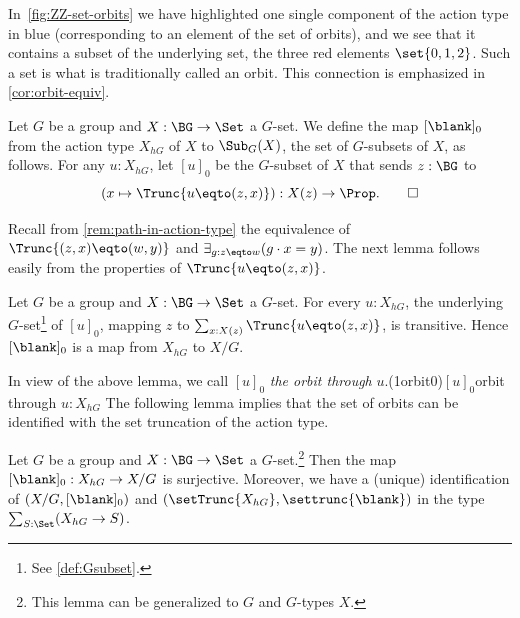 In~\cref{fig:ZZ-set-orbits} we have highlighted one single component of
the action type in blue (\ie corresponding to an element of the set of orbits),
and we see that it contains a subset of the underlying set,
the three red elements $\set{0,1,2}$.
Such a set is what is traditionally called an orbit.
This connection is emphasized in \cref{cor:orbit-equiv}.

\begin{definition}\label{def:orbit-map}
Let $G$ be a group and $X : \BG\to\Set$ a $G$-set.
We define the map $[\blank]_0$ from the action type $X_{hG}$ of
$X$ to $\Sub_G(X)$, the set of $G$-subsets of $X$, as follows.
For any $u:X_{hG}$, let $[u]_0$ be the $G$-subset of $X$ that
sends $z:\BG$ to
\[
(x \mapsto \Trunc{u\eqto(z,x)}) : X(z) \to \Prop.\qedhere
\]
\end{definition}

Recall from \cref{rem:path-in-action-type} the equivalence of
$\Trunc{(z,x)\eqto(w,y)}$ and $\exists_{g:z\eqto w}(g\cdot x = y)$.
The next lemma follows easily from the properties of $\Trunc{u\eqto(z,x)}$.

\begin{lemma}\label{lem:[]0-maps-to-X/G}
  Let $G$ be a group and $X : \BG\to\Set$ a $G$-set.  For every $u:X_{hG}$, the
  underlying $G$-set\footnote{See \cref{def:Gsubset}.} of $[u]_0$, mapping $z$
  to $\sum_{x:X(z)}\Trunc{u\eqto(z,x)}$, is transitive.  Hence $[\blank]_0$ is
  a map from $X_{hG}$ to $X/G$.
\end{lemma}

In view of the above lemma, we call $[u]_0$ \emph{the orbit
through} $u$.\glossary(1orbit0){$[u]_0$}{orbit through $u:X_{hG}$}
The following lemma implies that the set of orbits can 
be identified with the set truncation of the action type.

\begin{lemma}\label{lem:X/G=setTruncX_hG}
  Let $G$ be a group and $X : \BG\to\Set$ a $G$-set.\footnote{%
  This lemma can be generalized to \inftygps $G$ and $G$-types $X$.}
  Then the map $[\blank]_0 :X_{hG}\to X/G $ is surjective.
  Moreover, we have a (unique) identification of
  $(X/G,[\blank]_0)$ and $(\setTrunc{X_{hG}},\settrunc{\blank})$
  in the type $\sum_{S:\Set}(X_{hG}\to S)$.
\end{lemma}

